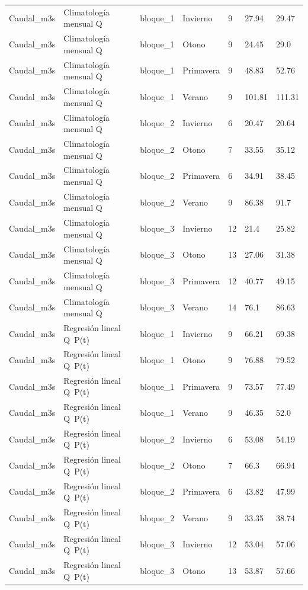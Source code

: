 \begin{longtable}{lllllll}
Caudal\_m3s & Climatología mensual Q & bloque\_1 & Invierno & 9 & 27.94 & 29.47 \\
Caudal\_m3s & Climatología mensual Q & bloque\_1 & Otono & 9 & 24.45 & 29.0 \\
Caudal\_m3s & Climatología mensual Q & bloque\_1 & Primavera & 9 & 48.83 & 52.76 \\
Caudal\_m3s & Climatología mensual Q & bloque\_1 & Verano & 9 & 101.81 & 111.31 \\
Caudal\_m3s & Climatología mensual Q & bloque\_2 & Invierno & 6 & 20.47 & 20.64 \\
Caudal\_m3s & Climatología mensual Q & bloque\_2 & Otono & 7 & 33.55 & 35.12 \\
Caudal\_m3s & Climatología mensual Q & bloque\_2 & Primavera & 6 & 34.91 & 38.45 \\
Caudal\_m3s & Climatología mensual Q & bloque\_2 & Verano & 9 & 86.38 & 91.7 \\
Caudal\_m3s & Climatología mensual Q & bloque\_3 & Invierno & 12 & 21.4 & 25.82 \\
Caudal\_m3s & Climatología mensual Q & bloque\_3 & Otono & 13 & 27.06 & 31.38 \\
Caudal\_m3s & Climatología mensual Q & bloque\_3 & Primavera & 12 & 40.77 & 49.15 \\
Caudal\_m3s & Climatología mensual Q & bloque\_3 & Verano & 14 & 76.1 & 86.63 \\
Caudal\_m3s & Regresión lineal Q~P(t) & bloque\_1 & Invierno & 9 & 66.21 & 69.38 \\
Caudal\_m3s & Regresión lineal Q~P(t) & bloque\_1 & Otono & 9 & 76.88 & 79.52 \\
Caudal\_m3s & Regresión lineal Q~P(t) & bloque\_1 & Primavera & 9 & 73.57 & 77.49 \\
Caudal\_m3s & Regresión lineal Q~P(t) & bloque\_1 & Verano & 9 & 46.35 & 52.0 \\
Caudal\_m3s & Regresión lineal Q~P(t) & bloque\_2 & Invierno & 6 & 53.08 & 54.19 \\
Caudal\_m3s & Regresión lineal Q~P(t) & bloque\_2 & Otono & 7 & 66.3 & 66.94 \\
Caudal\_m3s & Regresión lineal Q~P(t) & bloque\_2 & Primavera & 6 & 43.82 & 47.99 \\
Caudal\_m3s & Regresión lineal Q~P(t) & bloque\_2 & Verano & 9 & 33.35 & 38.74 \\
Caudal\_m3s & Regresión lineal Q~P(t) & bloque\_3 & Invierno & 12 & 53.04 & 57.06 \\
Caudal\_m3s & Regresión lineal Q~P(t) & bloque\_3 & Otono & 13 & 53.87 & 57.66 \\

\end{longtable}
